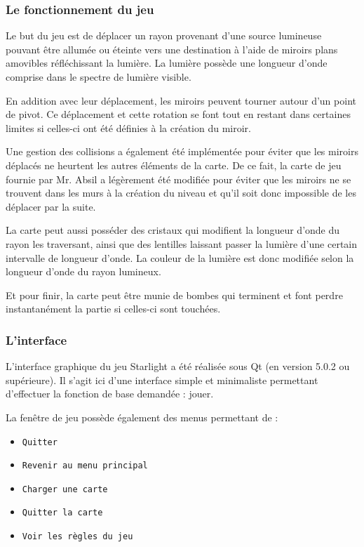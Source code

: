 \documentclass[]{article}
\begin{document}
\subsubsection{Le fonctionnement du jeu}

Le but du jeu est de déplacer un rayon provenant d'une source lumineuse
pouvant être allumée ou éteinte
vers une destination à l'aide de miroirs plans amovibles réfléchissant
la lumière.
La lumière possède une longueur d'onde comprise dans le spectre
de lumière visible.

En addition avec leur déplacement, les miroirs peuvent tourner
autour d'un point de pivot.
Ce déplacement et cette rotation se font tout en restant
dans certaines limites si celles-ci ont été définies à la création du miroir.

Une gestion des collisions a également été implémentée pour
éviter que les miroirs déplacés ne heurtent les autres éléments de la carte.
De ce fait, la carte de jeu fournie par Mr. Absil a légèrement été modifiée
pour éviter que les miroirs ne se trouvent dans les murs à la création du niveau
et qu'il soit donc impossible de les déplacer par la suite.

La carte peut aussi posséder des cristaux qui modifient la longueur d'onde
du rayon les traversant, ainsi que des lentilles laissant passer la lumière
d'une certain intervalle de longueur d'onde.
La couleur de la lumière est donc modifiée selon la longueur d'onde 
du rayon lumineux.

Et pour finir, la carte peut être munie de bombes qui terminent et font perdre
instantanément la partie si celles-ci sont touchées. 


\subsubsection{L'interface}

L'interface graphique du jeu Starlight a été réalisée sous Qt (en version 5.0.2 ou supérieure).
Il s'agit ici d'une interface simple et minimaliste permettant d'effectuer la fonction de base 
demandée : jouer.

La fenêtre de jeu possède également des menus permettant de :

\begin{itemize}
    \item \texttt{Quitter}
    \item \texttt{Revenir au menu principal}
    \item \texttt{Charger une carte}
    \item \texttt{Quitter la carte}
    \item \texttt{Voir les règles du jeu}
\end{itemize}
\end{document}
